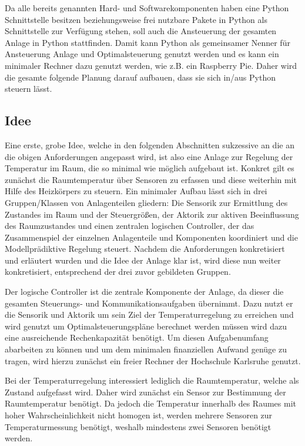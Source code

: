 Da alle bereits genannten Hard- und Softwarekomponenten haben eine Python Schnittstelle besitzen beziehungsweise frei nutzbare Pakete in Python als Schnittstelle zur Verfügung stehen, soll auch die Ansteuerung der gesamten Anlage in Python stattfinden. Damit kann Python als gemeinsamer Nenner für Ansteuerung Anlage und Optimalsteuerung genutzt werden und es kann ein minimaler Rechner dazu genutzt werden, wie z.B. ein Raspberry Pie. Daher wird die gesamte folgende Planung darauf aufbauen, dass sie sich in/aus Python steuern lässt.


\subsection{Idee}

Eine erste, grobe Idee, welche in den folgenden Abschnitten sukzessive an die an die obigen Anforderungen angepasst wird, ist also eine Anlage zur Regelung der Temperatur im Raum, die so minimal wie möglich aufgebaut ist. Konkret gilt es zunächst die Raumtemperatur über Sensoren zu erfassen und diese weiterhin mit Hilfe des Heizkörpers zu steuern. Ein minimaler Aufbau lässt sich in drei Gruppen/Klassen von Anlagenteilen gliedern: Die Sensorik zur Ermittlung des Zustandes im Raum und der Steuergrößen, der Aktorik zur aktiven Beeinflussung des Raumzustandes und einen zentralen logischen Controller, der das Zusammenspiel der einzelnen Anlagenteile und Komponenten koordiniert und die Modellprädiktive Regelung steuert.
Nachdem die Anforderungen konkretisiert und erläutert wurden und die Idee der Anlage klar ist, wird diese nun weiter konkretisiert, entsprechend der drei zuvor gebildeten Gruppen.

Der logische Controller ist die zentrale Komponente der Anlage, da dieser die gesamten Steuerungs- und Kommunikationsaufgaben übernimmt. Dazu nutzt er die Sensorik und Aktorik um sein Ziel der Temperaturregelung zu erreichen und wird genutzt um  Optimalsteuerungspläne berechnet werden müssen wird dazu eine ausreichende Rechenkapazität benötigt. Um diesen Aufgabenumfang abarbeiten zu können und um dem minimalen finanziellen Aufwand genüge zu tragen, wird hierzu zunächst ein freier Rechner der Hochschule Karlsruhe genutzt.

Bei der Temperaturregelung interessiert lediglich die Raumtemperatur, welche als Zustand aufgefasst wird. Daher wird zunächst ein Sensor zur Bestimmung der Raumtemperatur benötigt. Da jedoch die Temperatur innerhalb des Raumes mit hoher Wahrscheinlichkeit nicht homogen ist, werden mehrere Sensoren zur Temperaturmessung benötigt, weshalb mindestens zwei Sensoren benötigt werden.

